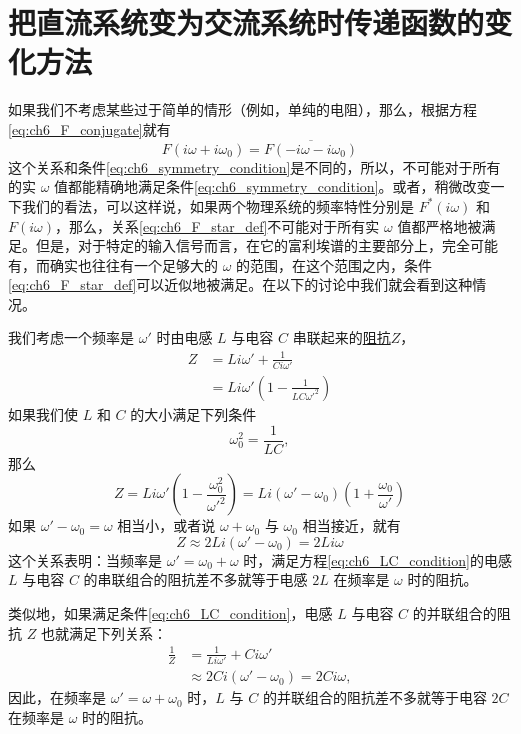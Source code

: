 \section{把直流系统变为交流系统时传递函数的变化方法}

如果我们不考虑某些过于简单的情形（例如，单纯的电阻），那么，根据方程\eqref{eq:ch6_F_conjugate}就有
\begin{equation*}
F(i\omega + i\omega_0) = \overline{F(-i\omega - i\omega_0)}
\end{equation*}
这个关系和条件\eqref{eq:ch6_symmetry_condition}是不同的，所以，不可能对于所有的实 $\omega$ 值都能精确地满足条件\eqref{eq:ch6_symmetry_condition}。或者，稍微改变一下我们的看法，可以这样说，如果两个物理系统的频率特性分别是 $F^*(i\omega)$ 和 $F(i\omega)$，那么，关系\eqref{eq:ch6_F_star_def}不可能对于所有实 $\omega$ 值都严格地被满足。但是，对于特定的输入信号而言，在它的富利埃谱的主要部分上，完全可能有，而确实也往往有一个足够大的 $\omega$ 的范围，在这个范围之内，条件\eqref{eq:ch6_F_star_def}可以近似地被满足。在以下的讨论中我们就会看到这种情况。

我们考虑一个频率是 $\omega'$ 时由电感 $L$ 与电容 $C$ 串联起来的\underline{阻抗}$Z$，
\begin{equation*}
\begin{array}{ll}
Z &= Li\omega' + \frac{1}{Ci\omega'}\\
  &= Li\omega' \left( 1 - \frac{1}{LC\omega'^2} \right)
\end{array}
\end{equation*}
如果我们使 $L$ 和 $C$ 的大小满足下列条件
\begin{equation}\label{eq:ch6_LC_condition}
\omega_0^2 = \frac{1}{LC},
\end{equation}
那么
\begin{equation*}
Z = Li\omega' \left( 1 - \frac{\omega_0^2}{\omega'^2} \right) = Li(\omega' - \omega_0) \left( 1 + \frac{\omega_0}{\omega'} \right)
\end{equation*}
如果 $\omega' - \omega_0 = \omega$ 相当小，或者说 $\omega + \omega_0$ 与 $\omega_0$ 相当接近，就有
\begin{equation*}
Z \approx 2Li(\omega' - \omega_0) = 2Li\omega
\end{equation*}
这个关系表明：当频率是 $\omega' = \omega_0 + \omega$ 时，满足方程\eqref{eq:ch6_LC_condition}的电感 $L$ 与电容 $C$ 的串联组合的阻抗差不多就等于电感 $2L$ 在频率是 $\omega$ 时的阻抗。

类似地，如果满足条件\eqref{eq:ch6_LC_condition}，电感 $L$ 与电容 $C$ 的并联组合的阻抗 $Z$ 也就满足下列关系：
\begin{equation*}
\begin{array}{ll}
\frac{1}{Z} & = \frac{1}{Li\omega'} + Ci\omega'\\
		    & \approx 2Ci(\omega' - \omega_0) = 2Ci\omega,
\end{array}
\end{equation*}
因此，在频率是 $\omega' = \omega + \omega_0$ 时，$L$ 与 $C$ 的并联组合的阻抗差不多就等于电容 $2C$ 在频率是 $\omega$ 时的阻抗。

